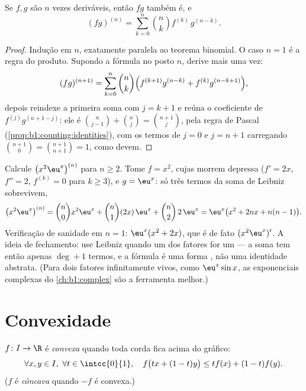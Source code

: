 \begin{theorem}\label{thm:b1:derivative:leibniz}
Se $f, g$ são $n$ vezes deriváveis, então $fg$ também é,
e
\[
(fg)^{(n)} = \sum_{k=0}^{n} \binom nk f^{(k)}\, g^{(n-k)} .
\]
\end{theorem}

\begin{proof}
Indução em $n$, exatamente paralela ao teorema binomial. O
caso $n = 1$ é a regra do produto. Supondo a fórmula no posto
$n$, derive mais uma vez:
\[
(fg)^{(n+1)} = \sum_{k=0}^{n} \binom nk
\Bigl( f^{(k+1)} g^{(n-k)} + f^{(k)} g^{(n-k+1)} \Bigr),
\]
depois reindexe a primeira soma com $j = k + 1$ e reúna o
coeficiente de $f^{(j)} g^{(n+1-j)}$: ele é $\binom{n}{j-1} +
\binom nj = \binom{n+1}{j}$, pela regra de Pascal
(\cref{prop:b1:counting:identities}), com os termos de  $j = 0$
e $j = n + 1$ carregando $\binom{n+1}{0} = \binom{n+1}{n+1} =
1$, como devem.
\end{proof}

\begin{example}\label{ex:b1:derivative:leibnizaction}
Calcule $\bigl(x^2 \eu^x\bigr)^{(n)}$ para $n \geq 2$. Tome $f =
x^2$, cujas  morrem depressa ($f' = 2x$, $f'' = 2$,
$f^{(k)} = 0$ para $k \geq 3$), e $g = \eu^x$: só três termos
da soma de Leibniz sobrevivem,
\[
\bigl(x^2\eu^x\bigr)^{(n)}
= \binom n0 x^2 \eu^x + \binom n1 (2x)\,\eu^x + \binom n2\,
2\,\eu^x
= \eu^x\bigl(x^2 + 2nx + n(n-1)\bigr).
\]
Verificação de sanidade em $n = 1$: $\eu^x(x^2 + 2x)$, que é de fato
$(x^2\eu^x)'$. A ideia de fechamento: use Leibniz quando um dos fatores
for um  --- a soma tem então apenas $\deg + 1$ termos, e
a fórmula é uma forma , não uma identidade abstrata. (Para dois
fatores infinitamente vivos, como $\eu^x\sin x$, as exponenciais
complexas do \cref{ch:b1:complex} são a ferramenta melhor.)
\end{example}

\section{Convexidade}

\begin{definition}\label{def:b1:derivative:convex}
$f \colon I \to \R$ é \emph{convexa} quando
toda corda fica acima do gráfico:
\[
\forall x, y \in I,\ \forall t \in \intcc{0}{1}, \quad
f\bigl(tx + (1-t)y\bigr) \leq t f(x) + (1-t) f(y).
\]
($f$ é \emph{côncava} quando $-f$ é convexa.)
\end{definition}

